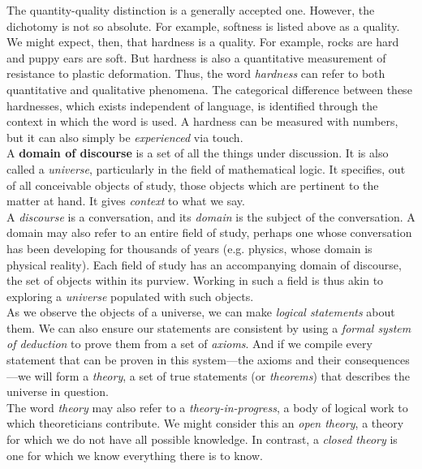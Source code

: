The quantity-quality distinction is a generally accepted one. However, the dichotomy is not so absolute. For example, softness is listed above as a quality. We might expect, then, that hardness is a quality. For example, rocks are hard and puppy ears are soft. But hardness is also a quantitative measurement of resistance to plastic deformation. Thus, the word \textit{hardness} can refer to both quantitative and qualitative phenomena. The categorical difference between these hardnesses, which exists independent of language, is identified through the context in which the word is used. A hardness can be measured with numbers, but it can also simply be \textit{experienced} via touch. \\

A \textbf{domain of discourse} is a set of all the things under discussion. It is also called a \textit{universe}, particularly in the field of mathematical logic. It specifies, out of all conceivable objects of study, those objects which are pertinent to the matter at hand. It gives \textit{context} to what we say. \\

A \textit{discourse} is a conversation, and its \textit{domain} is the subject of the conversation. A domain may also refer to an entire field of study, perhaps one whose conversation has been developing for thousands of years (e.g. physics, whose domain is physical reality). Each field of study has an accompanying domain of discourse, the set of objects within its purview. Working in such a field is thus akin to exploring a \textit{universe} populated with such objects. \\

As we observe the objects of a universe, we can make \textit{logical statements} about them. We can also ensure our statements are consistent by using a \textit{formal system of deduction} to prove them from a set of \textit{axioms}. And if we compile every statement that can be proven in this system---the axioms and their consequences---we will form a \textit{theory}, a set of true statements (or \textit{theorems}) that describes the universe in question. \\

The word \textit{theory} may also refer to a \textit{theory-in-progress}, a body of logical work to which theoreticians contribute. We might consider this an \textit{open theory}, a theory for which we do not have all possible knowledge. In contrast, a \textit{closed theory} is one for which we know everything there is to know. \\

